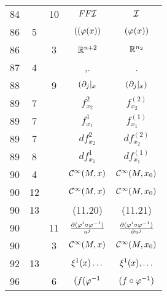 \documentclass[a4paper,11pt]{article}
\begin{document}
\begin{center}
\begin{tabular}{|c|c|c|c|c|}
    84  & & 10 & $FF\mathcal{I}$ & $\mathcal{I}$ \\
    86  &  5 & & $( ( \varphi( x ) )$ & $( \varphi( x ) )$ \\
    86  & &  3 & $\mathbb{R}^{ n + 2 }$ & $\mathbb{R}^{ n_{ 2 } }$ \\
    87  &  4 & & ,. & . \\
    88  & &  9 & $( \partial_{ j }|_{ x }$ & $( \partial_{ j }|_{ x } )$ \\
    89  &  7 & & $f_{ x_{ 2 } }^{ 2 }$ & $f_{ x_{ 2 } }^{ ( 2 ) }$ \\
    89  &  7 & & $f_{ x_{ 1 } }^{ 1 }$ & $f_{ x_{ 1 } }^{ ( 1 ) }$ \\
    89  &  7 & & $d f_{ x_{ 2 } }^{ 2 }$ & $d f_{ x_{ 2 } }^{ ( 2 ) }$ \\
    89  &  8 & & $d f_{ x_{ 1 } }^{ 1 }$ & $d f_{ x_{ 1 } }^{ ( 1 ) }$ \\
    90  &  4 & & $\mathcal{C}^{ \infty }( M, x )$ & $\mathcal{C}^{ \infty }( M, x_{ 0 } )$ \\
    90  & 12 & & $\mathcal{C}^{ \infty }( M, x )$
           & $\mathcal{C}^{ \infty }( M, x_{ 0 } )$ \\
    90  & 13 & & (11.20) & (11.21) \\
    90  & & 11 & $\frac{ \partial ( \varphi^{ i } \circ \varphi^{ -1 } ) }{ u^{ j } }$
           & $\frac{ \partial ( \varphi^{ i } \circ \varphi^{ -1 } ) }{ \partial u^{ j } }$ \\
    90  & &  3 & $\mathcal{C}^{ \infty }( M, x )$
           & $\mathcal{C}^{ \infty }( M, x_{ 0 } )$ \\
    92  & 13 & & $\xi^{ 1 }(x) \ldots$ & $\xi^{ 1 }(x), \ldots$ \\
    96  & &  6 & $( f ( \varphi^{ -1 }$ & $( f \circ \varphi^{ -1 } )$ \\ 
    \hline
  \end{tabular}


\end{center}
\end{document}
